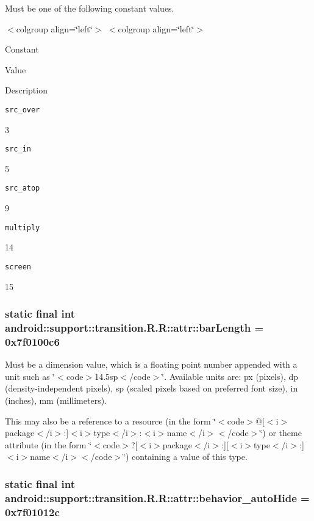 Must be one of the following constant values. \begin{TabularC}{0}
\hline
\end{TabularC}
$<$colgroup align=\char`\"{}left\char`\"{}$>$ $<$colgroup align=\char`\"{}left\char`\"{}$>$ 

Constant

Value

Description 

{\tt src\_\-over}

3

{\tt src\_\-in}

5

{\tt src\_\-atop}

9

{\tt multiply}

14

{\tt screen}

15\hypertarget{classandroid_1_1support_1_1transition_1_1_r_1_1attr_9890f25d14253620ae166fabbe152370}{
\subsubsection[{barLength}]{\setlength{\rightskip}{0pt plus 5cm}static final int android::support::transition.R.R::attr::barLength = 0x7f0100c6}}
\label{classandroid_1_1support_1_1transition_1_1_r_1_1attr_9890f25d14253620ae166fabbe152370}


Must be a dimension value, which is a floating point number appended with a unit such as \char`\"{}$<$code$>$14.5sp$<$/code$>$\char`\"{}. Available units are: px (pixels), dp (density-independent pixels), sp (scaled pixels based on preferred font size), in (inches), mm (millimeters). 

This may also be a reference to a resource (in the form \char`\"{}$<$code$>$@\mbox{[}$<$i$>$package$<$/i$>$:\mbox{]}$<$i$>$type$<$/i$>$:$<$i$>$name$<$/i$>$$<$/code$>$\char`\"{}) or theme attribute (in the form \char`\"{}$<$code$>$?\mbox{[}$<$i$>$package$<$/i$>$:\mbox{]}\mbox{[}$<$i$>$type$<$/i$>$:\mbox{]}$<$i$>$name$<$/i$>$$<$/code$>$\char`\"{}) containing a value of this type. \hypertarget{classandroid_1_1support_1_1transition_1_1_r_1_1attr_f719ee51da8db5ae28c47cfb89a325e6}{
\subsubsection[{behavior\_\-autoHide}]{\setlength{\rightskip}{0pt plus 5cm}static final int android::support::transition.R.R::attr::behavior\_\-autoHide = 0x7f01012c}}
\label{classandroid_1_1support_1_1transition_1_1_r_1_1attr_f719ee51da8db5ae28c47cfb89a325e6}


